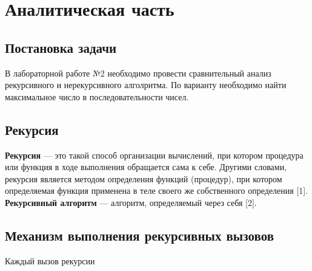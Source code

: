 \chapter{Аналитическая часть}

\section{Постановка задачи}
В лабораторной работе №2 необходимо провести сравнительный анализ рекурсивного и нерекурсивного алголритма. По варианту необходимо найти максимальное число в последовательности чисел.\newline 

\section{Рекурсия}
\textbf{Рекурсия} — это такой способ организации вычислений, при котором процедура или функция в ходе выполнения обращается сама к себе. Другими словами, рекурсия является методом определения функций (процедур), при котором определяемая функция применена в теле своего же собственного определения [1].
\textbf{Рекурсивный алгоритм} — алгоритм, определяемый через себя [2].

\section{Механизм выполнения рекурсивных вызовов}
Каждый вызов рекурсии 

\clearpage
